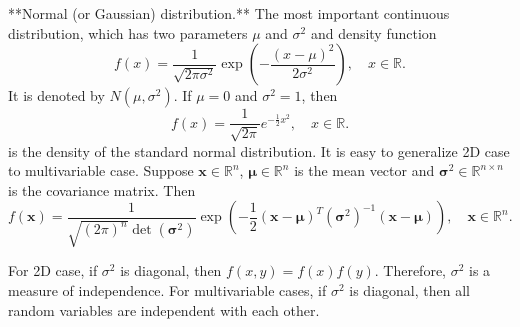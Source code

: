 \begin{example}
**Normal (or Gaussian) distribution.** The most important continuous distribution, which has two parameters $\mu$ and $\sigma^2$ and density function
\begin{equation*}
    f(x) = \frac{1}{\sqrt{2\pi\sigma^2}} \exp \left( -\frac{(x-\mu)^2}{2\sigma^2} \right), \quad x\in\mathbb{R}. 
\end{equation*}
It is denoted by $N(\mu, \sigma^2)$. If $\mu=0$ and $\sigma^2=1$, then
\begin{equation*}
    f(x) = \frac{1}{\sqrt{2\pi}} e^{-\frac{1}{2}x^2}, \quad x\in\mathbb{R}.
\end{equation*}
is the density of the standard normal distribution. It is easy to generalize 2D case to multivariable case. Suppose $\mathbf{x} \in \mathbb{R}^n$, $\mathbf{\mu} \in \mathbb{R}^n$ is the mean vector and $\mathbf{\sigma}^2 \in \mathbb{R}^{n\times n}$ is the covariance matrix. Then
\begin{equation*}
    f(\mathbf{x}) = \frac{1}{\sqrt{(2\pi)^n} \det(\mathbf{\sigma}^2)} \exp \left( -\frac{1}{2} (\mathbf{x}-\mathbf{\mu})^T (\mathbf{\sigma}^2)^{-1} (\mathbf{x}-\mathbf{\mu}) \right), \quad \mathbf{x} \in \mathbb{R}^n.
\end{equation*}

\begin{remark}
For 2D case, if $\sigma^2$ is diagonal, then $f(x,y) = f(x)f(y)$. Therefore, $\sigma^2$ is a measure of independence. For multivariable cases, if $\sigma^2$ is diagonal, then all random variables are independent with each other.
\end{remark}
\end{example}


